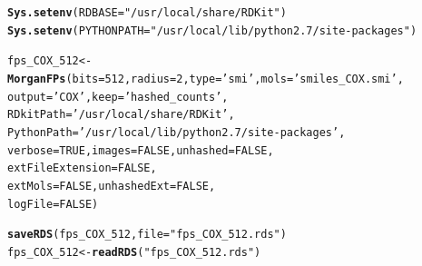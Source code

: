 \documentclass[twoside,a4wide,12pt]{article}\usepackage[]{graphicx}\usepackage[]{color}
\makeatletter
\newcommand{\hlnum}[1]{\textcolor[rgb]{0.686,0.059,0.569}{#1}}%
\newcommand{\hlstr}[1]{\textcolor[rgb]{0.192,0.494,0.8}{#1}}%
\newcommand{\hlstd}[1]{\textcolor[rgb]{0.345,0.345,0.345}{#1}}%
\newcommand{\hlkwb}[1]{\textcolor[rgb]{0.69,0.353,0.396}{#1}}%
\newcommand{\hlkwc}[1]{\textcolor[rgb]{0.333,0.667,0.333}{#1}}%
\newcommand{\hlkwd}[1]{\textcolor[rgb]{0.737,0.353,0.396}{\textbf{#1}}}%
\newenvironment{kframe}{%
 \def\at@end@of@kframe{}%
 \ifinner\ifhmode%
  \def\at@end@of@kframe{\end{minipage}}%
  \begin{minipage}{\columnwidth}%
 \fi\fi%
 \def\FrameCommand##1{\hskip\@totalleftmargin \hskip-\fboxsep
 \colorbox{shadecolor}{##1}\hskip-\fboxsep
     \hskip-\linewidth \hskip-\@totalleftmargin \hskip\columnwidth}%
 \MakeFramed {\advance\hsize-\width
   \@totalleftmargin\z@ \linewidth\hsize
   \@setminipage}}%
 {\par\unskip\endMakeFramed%
 \at@end@of@kframe}
\newenvironment{knitrout}{}{} %
\makeatother
\begin{document}
\begin{knitrout}
\color{fgcolor}\begin{kframe}
\begin{alltt}
\hlkwd{Sys.setenv}\hlstd{(}\hlkwc{RDBASE}\hlstd{=}\hlstr{"/usr/local/share/RDKit"}\hlstd{)}
\hlkwd{Sys.setenv}\hlstd{(}\hlkwc{PYTHONPATH}\hlstd{=}\hlstr{"/usr/local/lib/python2.7/site-packages"}\hlstd{)}

\hlstd{fps_COX_512} \hlkwb{<-} \hlkwd{MorganFPs}\hlstd{(}\hlkwc{bits}\hlstd{=}\hlnum{512}\hlstd{,}\hlkwc{radius}\hlstd{=}\hlnum{2}\hlstd{,}\hlkwc{type}\hlstd{=}\hlstr{'smi'}\hlstd{,}\hlkwc{mols}\hlstd{=}\hlstr{'smiles_COX.smi'}\hlstd{,}
                         \hlkwc{output}\hlstd{=}\hlstr{'COX'}\hlstd{,}\hlkwc{keep}\hlstd{=}\hlstr{'hashed_counts'}\hlstd{,}
                         \hlkwc{RDkitPath}\hlstd{=}\hlstr{'/usr/local/share/RDKit'}\hlstd{,}
                         \hlkwc{PythonPath}\hlstd{=}\hlstr{'/usr/local/lib/python2.7/site-packages'}\hlstd{,}
                         \hlkwc{verbose}\hlstd{=}\hlnum{TRUE}\hlstd{,} \hlkwc{images} \hlstd{=} \hlnum{FALSE}\hlstd{,} \hlkwc{unhashed} \hlstd{=} \hlnum{FALSE}\hlstd{,}
                         \hlkwc{extFileExtension} \hlstd{=} \hlnum{FALSE}\hlstd{,}
                         \hlkwc{extMols} \hlstd{=} \hlnum{FALSE}\hlstd{,} \hlkwc{unhashedExt} \hlstd{=} \hlnum{FALSE}\hlstd{,}
                         \hlkwc{logFile} \hlstd{=} \hlnum{FALSE}\hlstd{)}

\hlkwd{saveRDS}\hlstd{(fps_COX_512,}\hlkwc{file}\hlstd{=}\hlstr{"fps_COX_512.rds"}\hlstd{)}
\hlstd{fps_COX_512} \hlkwb{<-} \hlkwd{readRDS}\hlstd{(}\hlstr{"fps_COX_512.rds"}\hlstd{)}
\end{alltt}
\end{kframe}
\end{knitrout}
\end{document}
